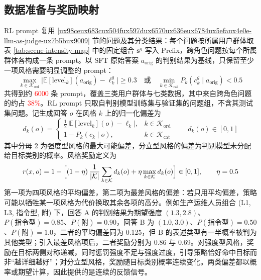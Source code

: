 \documentclass[fontset=fandol,type=master,campus=shenzhen,etitleauto=true]{hithesisbook}
\newcommand{\rev}[1]{\textcolor{red}{#1}}
\begin{document}
\subsection{数据准备与奖励映射}\label{ux6570ux636eux51c6ux5907ux4e0eux5956ux52b1ux6620ux5c04}

RL prompt 复用 \ref{ux98ceux683cux504fux597dux6570ux636eux6784ux5efaux4e0e-llm-as-judge-ux7b5bux9009} 节的问题及其分类结果：每个问题按所属用户群体取表 \ref{tab:scene-intensity-map} 中的固定组合 $\mathbf{s}^{g}$ 写入 Prefix，跨角色问题按每个所属群体各构成一条 prompt。以 SFT 原始答案 $a_{\text{orig}}$ 的判别结果为基线，只保留至少一项风格需要明显调整的 prompt：
\begin{equation}\label{eq:rl-prompt-filter}
\max_{k \in \mathcal{K}_{\text{ord}}} \bigl| \mathbb{E}[\text{level}_k](a_{\text{orig}}) - \ell^{g}_k \bigr| \ge 0.3 \quad \text{或} \quad \min_{k \in \mathcal{K}_{\text{cat}}} P_k(c^{g}_k \mid a_{\text{orig}}) < 0.5
\end{equation}
共得到约 \rev{6000} 条 prompt，覆盖三类用户群体与七类数据，其中来自跨角色问题的约占 \rev{38\%}。RL prompt 只取自判别模型训练集与验证集的问题组，不含其测试集问题。记生成回答 $o$ 在风格 $k$ 上的归一化偏差为
\begin{equation}\label{eq:style-deviation}
d_k(o) = \begin{cases} \frac{1}{2}\bigl| \mathbb{E}[\text{level}_k](o) - \ell_k \bigr|, & k \in \mathcal{K}_{\text{ord}} \\ 1 - P_k(c_k \mid o), & k \in \mathcal{K}_{\text{cat}} \end{cases} \qquad d_k(o) \in [0, 1]
\end{equation}
其中分母 2 为强度型风格的最大可能偏差，分立型风格的偏差为判别模型未分配给目标类别的概率。风格奖励定义为
\begin{equation}\label{eq:intensity-reward}
r(x, o) = 1 - \Bigl[ (1 - \eta)\, \frac{1}{|\mathcal{K}|} \sum_{k \in \mathcal{K}} d_k(o) + \eta \max_{k \in \mathcal{K}} d_k(o) \Bigr] \in [0, 1], \qquad \eta = 0.5
\end{equation}
第一项为四项风格的平均偏差，第二项为最差风格的偏差：若只用平均偏差，策略可能以牺牲某一项风格为代价换取其余各项的高分。例如生产运维人员组合 (L1, L3, 指令型, 附) 下，回答 A 的判别结果为期望强度 $(1.3, 2.8)$、$P(\text{指令型}) = 0.85$、$P(\text{附}) = 0.90$，回答 B 为 $(1.0, 3.0)$、$P(\text{指令型}) = 0.50$、$P(\text{附}) = 1.0$，二者的平均偏差同为 0.125，但 B 的表述类型有一半概率被判为其他类型；引入最差风格项后，二者奖励分别为 0.86 与 0.69。对强度型风格，奖励在目标两侧对称递减，同时惩罚强度不足与强度过度，引导策略恰好命中目标而非“越详细越好”；对分立型风格，奖励随目标类别概率连续变化。两类偏差都以概率或期望计算，因此提供的是连续的反馈信号。
\end{document}
